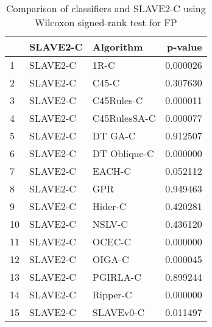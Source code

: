\begin{table}
\footnotesize
\caption{Comparison of classifiers and SLAVE2-C using Wilcoxon signed-rank test for FP}
\label{tab:SLAVE2-C wilcoxon FP comparison}
\begin{tabular}{lllr}
\hline
 & SLAVE2-C & Algorithm & p-value \\
\hline
1 & SLAVE2-C & 1R-C & 0.000026 \\
2 & SLAVE2-C & C45-C & 0.307630 \\
3 & SLAVE2-C & C45Rules-C & 0.000011 \\
4 & SLAVE2-C & C45RulesSA-C & 0.000077 \\
5 & SLAVE2-C & DT GA-C & 0.912507 \\
6 & SLAVE2-C & DT Oblique-C & 0.000000 \\
7 & SLAVE2-C & EACH-C & 0.052112 \\
8 & SLAVE2-C & GPR & 0.949463 \\
9 & SLAVE2-C & Hider-C & 0.420281 \\
10 & SLAVE2-C & NSLV-C & 0.436120 \\
11 & SLAVE2-C & OCEC-C & 0.000000 \\
12 & SLAVE2-C & OIGA-C & 0.000045 \\
13 & SLAVE2-C & PGIRLA-C & 0.899244 \\
14 & SLAVE2-C & Ripper-C & 0.000000 \\
15 & SLAVE2-C & SLAVEv0-C & 0.011497 \\
\hline
\end{tabular}
\end{table}
